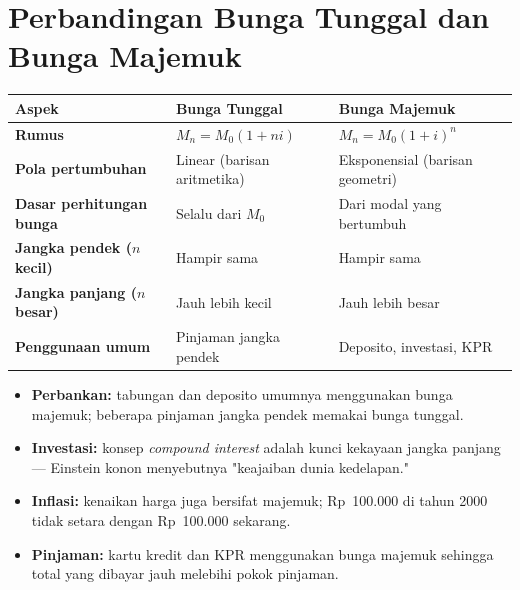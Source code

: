 \documentclass[11pt,a4paper]{report}
\theoremstyle{gaya}
\begin{document}
\section{Perbandingan Bunga Tunggal dan Bunga Majemuk}

\begin{center}
\begin{tabular}{>{\bfseries}p{3.8cm} p{5cm} p{5cm}}
\toprule
Aspek & Bunga Tunggal & Bunga Majemuk \\
\midrule
Rumus & $M_n = M_0(1+ni)$ & $M_n = M_0(1+i)^n$ \\
Pola pertumbuhan & Linear (barisan aritmetika) & Eksponensial (barisan geometri) \\
Dasar perhitungan bunga & Selalu dari $M_0$ & Dari modal yang bertumbuh \\
Jangka pendek ($n$ kecil) & Hampir sama & Hampir sama \\
Jangka panjang ($n$ besar) & Jauh lebih kecil & Jauh lebih besar \\
Penggunaan umum & Pinjaman jangka pendek & Deposito, investasi, KPR \\
\bottomrule
\end{tabular}
\end{center}

\begin{dunianyata}
\begin{itemize}[leftmargin=*,topsep=2pt]
  \item \textbf{Perbankan:} tabungan dan deposito umumnya menggunakan bunga majemuk; beberapa pinjaman jangka pendek memakai bunga tunggal.
  \item \textbf{Investasi:} konsep \emph{compound interest} adalah kunci kekayaan jangka panjang --- Einstein konon menyebutnya "keajaiban dunia kedelapan."
  \item \textbf{Inflasi:} kenaikan harga juga bersifat majemuk; Rp~100.000 di tahun 2000 tidak setara dengan Rp~100.000 sekarang.
  \item \textbf{Pinjaman:} kartu kredit dan KPR menggunakan bunga majemuk sehingga total yang dibayar jauh melebihi pokok pinjaman.
\end{itemize}
\end{dunianyata}
\end{document}
